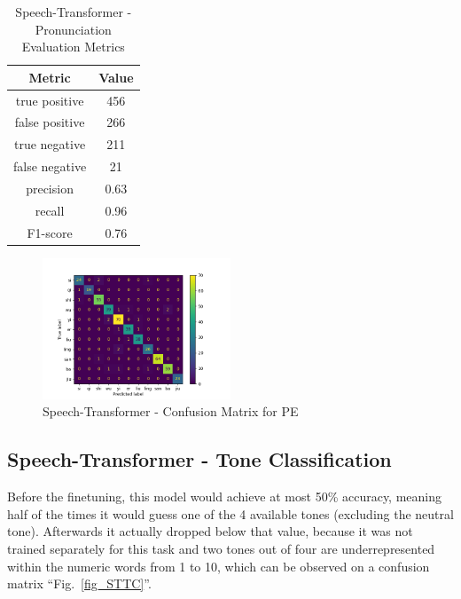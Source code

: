 \documentclass[conference]{IEEEtran}
\begin{document}
\begin{table}[hbtp]
\caption{Speech-Transformer - Pronunciation Evaluation Metrics}
\begin{center}
\begin{tabular}{|c|c|}
\hline
\textbf{Metric} & {\textbf{Value}} \\
\hline
true positive & 456 \\
\hline
false positive & 266 \\
\hline
true negative & 211 \\
\hline
false negative & 21 \\
\hline
precision & 0.63 \\
\hline
recall & 0.96 \\
\hline
F1-score & 0.76 \\
\hline
\end{tabular}
\label{tab_STPE}
\end{center}
\end{table}

\begin{figure}[hbtp]
\centerline{\includegraphics[width=0.5\textwidth]{Figures/Fig_STPE.png}}
\caption{Speech-Transformer - Confusion Matrix for PE}
\label{fig_STPE} %
\end{figure}

\subsection{Speech-Transformer - Tone Classification}
Before the finetuning, this model would achieve at most 50\% accuracy, meaning half of the times it would guess one of the 4 available tones (excluding the neutral tone).
Afterwards it actually dropped below that value, because it was not trained separately for this task and two tones out of four are underrepresented within the numeric words from 1 to 10, which can be observed on a confusion matrix ``Fig.~\ref{fig_STTC}''.
\end{document}
